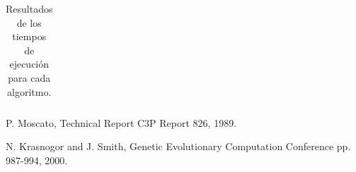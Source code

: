 \documentclass[conference]{IEEEtran}
\begin{document}
\begin{table}[!ht]
\begin{tabular}{|c|c|c|c|c|c|c|c|c|c|c|c|c|}
\end{tabular}
\caption{Resultados de los tiempos de ejecuci\'on para cada algoritmo.}
\end{table}


%


\begin{thebibliography}{1}

P. Moscato,
\newblock  Technical Report C3P Report 826, 1989.

%
N. Krasnogor and J. Smith,
\newblock Genetic Evolutionary Computation Conference pp. 987-994, 2000. 

\end{thebibliography}
\end{document}
